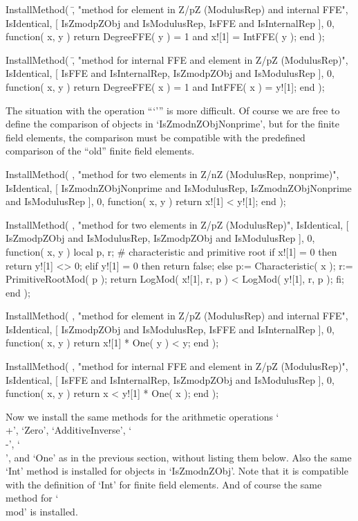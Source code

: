 \begintt
    InstallMethod( \=,
        "method for element in Z/pZ (ModulusRep) and internal FFE",
        IsIdentical,
        [ IsZmodpZObj and IsModulusRep, IsFFE and IsInternalRep ], 0,
        function( x, y )
        return DegreeFFE( y ) = 1 and x![1] = IntFFE( y );
        end );

    InstallMethod( \=,
        "method for internal FFE and element in Z/pZ (ModulusRep)",
        IsIdentical,
        [ IsFFE and IsInternalRep, IsZmodpZObj and IsModulusRep ], 0,
        function( x, y )
        return DegreeFFE( x ) = 1 and IntFFE( x ) = y![1];
        end );
\endtt

The situation with the operation ```\<''' is more difficult.
Of course we are free to define the comparison of objects in
`IsZmodnZObjNonprime',
but for the finite field elements, the comparison must be compatible
with the predefined comparison of the ``old'' finite field elements.

\begintt
    InstallMethod( \<,
        "method for two elements in Z/nZ (ModulusRep, nonprime)",
        IsIdentical,
        [ IsZmodnZObjNonprime and IsModulusRep,
          IsZmodnZObjNonprime and IsModulusRep ], 0,
        function( x, y ) return x![1] < y![1]; end );

    InstallMethod( \<,
        "method for two elements in Z/pZ (ModulusRep)",
        IsIdentical,
        [ IsZmodpZObj and IsModulusRep,
          IsZmodpZObj and IsModulusRep ], 0,
        function( x, y )
        local p, r;      # characteristic and primitive root
        if x![1] = 0 then
          return y![1] <> 0;
        elif y![1] = 0 then
          return false;
        else
          p:= Characteristic( x );
          r:= PrimitiveRootMod( p );
          return LogMod( x![1], r, p ) < LogMod( y![1], r, p );
        fi;
        end );

    InstallMethod( \<,
        "method for element in Z/pZ (ModulusRep) and internal FFE",
        IsIdentical,
        [ IsZmodpZObj and IsModulusRep, IsFFE and IsInternalRep ], 0,
        function( x, y )
        return x![1] * One( y ) < y;
        end );

    InstallMethod( \<,
        "method for internal FFE and element in Z/pZ (ModulusRep)",
        IsIdentical,
        [ IsFFE and IsInternalRep, IsZmodpZObj and IsModulusRep ], 0,
        function( x, y )
        return x < y![1] * One( x );
        end );
\endtt

Now we install the same methods for the arithmetic operations
`\\+', `Zero', `AdditiveInverse', `\\-', `\\\*', and `One'
as in the previous section, without listing them below.
Also the same `Int' method is installed for objects in `IsZmodnZObj'.
Note that it is compatible with the definition of `Int' for finite
field elements.
And of course the same method for `\\mod' is installed.


